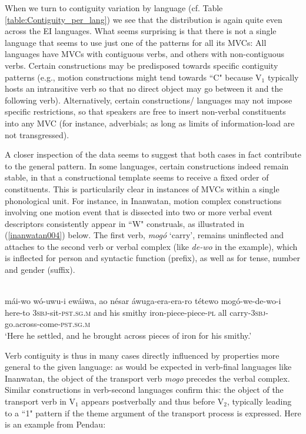 When we turn to contiguity variation by language (cf. Table \ref{table:Contiguity_per_lang}) we see that the distribution is again quite even across the EI languages. What seems surprising is that there is not a single language that seems to use just one of the patterns for all its MVCs: All languages have MVCs with contiguous verbs, and others with non-contiguous verbs. Certain constructions may be predisposed towards specific contiguity patterns (e.g., motion constructions might tend towards ``C" because V$_1$ typically hosts an intransitive verb so that no direct object may go between it and the following verb). Alternatively, certain constructions/ languages may not impose specific restrictions, so that speakers are free to insert non-verbal constituents into any MVC (for instance, adverbials; as long as limits of information-load are not transgressed). 

A closer inspection of the data seems to suggest that both cases in fact contribute to the general pattern. In some languages, certain constructions indeed remain stable, in that a constructional template seems to receive a fixed order of constituents. This is particularily clear in instances of MVCs within a single phonological unit. For instance, in Inanwatan, motion complex constructions involving one motion event that is dissected into two or more verbal event descriptors consistently appear in ``W" construals, as illustrated in (\ref{inanwatan004}) below. The first verb, \textit{mogó} `carry', remains uninflected and attaches to the second verb or verbal complex (like \textit{de-wo} in the example), which is inflected for person and syntactic function (prefix), as well as for tense, number and gender (suffix).

\ea \label{inanwatan004}
\\
\gll mái-wo wó-uwu-i ewáiwa, ao nésar áwuga-era-era-ro tétewo mogó-we-de-wo-i \\
here-to 3\textsc{sbj}-sit-\textsc{pst}.\textsc{sg}.\textsc{m} and his smithy iron-piece-piece-\textsc{pl} all carry-3\textsc{sbj}-go.across-come-\textsc{pst}.\textsc{sg}.\textsc{m} \\
\glft `Here he settled, and he brought across pieces of iron for his smithy.'\\ 
\z

Verb contiguity is thus in many cases directly influenced by properties more general to the given language: as would be expected in verb-final languages like Inanwatan, the object of the transport verb \textit{mogo} precedes the verbal complex. Similar constructions in verb-second languages confirm this: the object of the transport verb in V$_1$ appears postverbally and thus before V$_2$, typically leading to a ``1" pattern if the theme argument of the transport process is expressed. Here is an example from Pendau:

